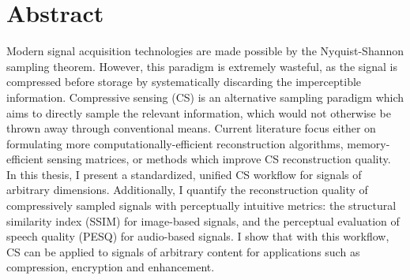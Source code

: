 \chapter*{Abstract}

Modern signal acquisition technologies are made possible by the Nyquist-Shannon sampling theorem. However, this paradigm is extremely wasteful, as the signal is compressed before storage by systematically discarding the imperceptible information. Compressive sensing (CS) is an alternative sampling paradigm which aims to directly sample the relevant information, which would not otherwise be thrown away through conventional means. Current literature focus either on formulating more computationally-efficient reconstruction algorithms, memory-efficient sensing matrices, or methods which improve CS reconstruction quality. In this thesis, I present a standardized, unified CS workflow for signals of arbitrary dimensions. Additionally, I quantify the reconstruction quality of compressively sampled signals with perceptually intuitive metrics: the structural similarity index (SSIM) for image-based signals, and the perceptual evaluation of speech quality (PESQ) for audio-based signals. I show that with this workflow, CS can be applied to signals of arbitrary content for applications such as compression, encryption and enhancement.

%
